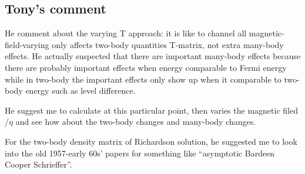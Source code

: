 \subsection{Tony's comment}
He comment about the varying T approach: it is like to channel all magnetic-field-varying only affects two-body quantities T-matrix, not extra many-body effects. He actually suspected that there are important many-body effects because there are probably important effects when energy comparable to Fermi energy while in two-body the important effects only show up when it comparable to two-body energy such as level difference.  

He suggest me to calculate at this particular point, then varies the magnetic filed /$\eta$ and see how about the two-body changes and many-body changes.  

For the two-body density matrix of Richardson solution, he suggested me to look into the old 1957-early 60s' papers for something like ``asymptotic Bardeen Cooper Schrieffer''.  